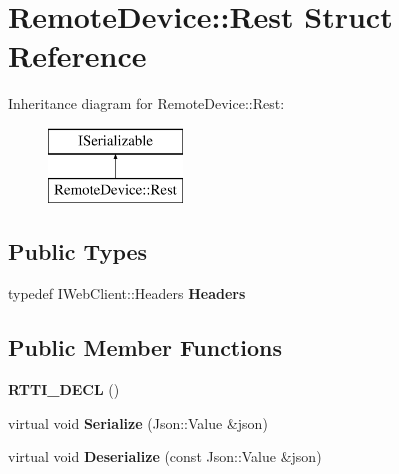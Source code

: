 \hypertarget{struct_remote_device_1_1_rest}{}\section{Remote\+Device\+:\+:Rest Struct Reference}
\label{struct_remote_device_1_1_rest}
Inheritance diagram for Remote\+Device\+:\+:Rest\+:\begin{figure}[H]
\begin{center}
\leavevmode
\includegraphics[height=2.000000cm]{struct_remote_device_1_1_rest}
\end{center}
\end{figure}
\subsection*{Public Types}
\begin{DoxyCompactItemize}
\item 
\mbox{\label{struct_remote_device_1_1_rest_a276e973b6468c5f861f8624d0d95636a}} 
typedef I\+Web\+Client\+::\+Headers {\bfseries Headers}
\end{DoxyCompactItemize}
\subsection*{Public Member Functions}
\begin{DoxyCompactItemize}
\item 
\mbox{\label{struct_remote_device_1_1_rest_af35ee944eeb2c9f45752cab31a5b1b41}} 
{\bfseries R\+T\+T\+I\+\_\+\+D\+E\+CL} ()
\item 
\mbox{\label{struct_remote_device_1_1_rest_a1159df6f4373ed89055ceb163dc677d2}} 
virtual void {\bfseries Serialize} (Json\+::\+Value \&json)
\item 
\mbox{\label{struct_remote_device_1_1_rest_a1cb7cdd50a916cfbe2c034499bfcb85c}} 
virtual void {\bfseries Deserialize} (const Json\+::\+Value \&json)
\end{DoxyCompactItemize}
